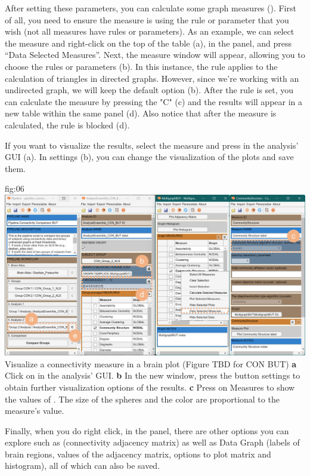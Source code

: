 \documentclass[justified]{tufte-handout}
\begin{document}
 After setting these parameters, you can calculate some graph measures (). First of all, you need to ensure the measure is using the rule or parameter that you wish (not all measures have rules or parameters). As an example, we can select the measure  and right-click on the top of the table (a), in the  panel, and press “Data Selected Measures”. 
 Next, the measure window will appear, allowing you to choose the rules or parameters (b). In this instance, the rule applies to the calculation of triangles in directed graphs. However, since we're working with an undirected graph, we will keep the default option (b).
After the rule is set, you can calculate the measure by pressing the "C" (c) and the results will appear in a new table within the same panel (d). Also notice that after the measure is calculated, the rule is blocked (d).
 
 If you want to visualize the results, select the measure and press  in the analysis' GUI (a). In settings (b), you can change the visualization of the plots and save them. 
 
	{fig:06}
	{
	\includegraphics{fig06.jpg}
	}
	{Visualize a connectivity measure in a brain plot (Figure TBD for CON BUT)}
	{
	{\bf a} Click on  in the analysis' GUI.
        {\bf b} In the new window, press the button settings to obtain further visualization options of the results.
        {\bf c} Press on Measures to show the values of . The size of the spheres and the color are proportional to the measure's value.   
	}
 
 Finally, when you do right click, in the  panel, there are other options you can explore such as  (connectivity adjacency matrix) as well as Data Graph (labels of brain regions, values of the adjacency matrix, options to plot matrix and histogram), all of which can also be saved.
  
\end{document}
